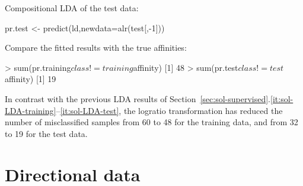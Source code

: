 \begin{enumerate}
Compositional LDA of the test data:

\begin{script}[firstnumber=3]
pr.test <- predict(ld,newdata=alr(test[,-1]))
\end{script}

Compare the fitted results with the true affinities:

\begin{console}
> sum(pr.training$class != training$affinity)
[1] 48
> sum(pr.test$class != test$affinity)
[1] 19
\end{console}

In contrast with the previous LDA results of
Section~\ref{sec:sol-supervised}.\ref{it:sol-LDA-training}--\ref{it:sol-LDA-test},
the logratio transformation has reduced the number of misclassified
samples from 60 to 48 for the training data, and from 32 to 19 for the
test data.

\end{enumerate}

\section{Directional data}
\label{sec:sol-directional}

